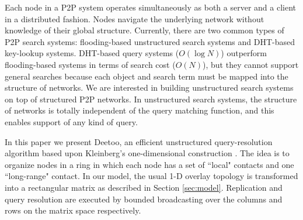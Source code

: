 \documentclass[conference]{IEEEtran}
\begin{document}
Each node in a P2P system operates simultaneously as both a server and a client
in a distributed fashion. Nodes navigate the
underlying network without knowledge of their global structure. 
Currently, there are two common types of P2P search systems: flooding-based
unstructured search systems and DHT-based key-lookup systems. 
DHT-based query systems ($O(\log N)$) outperform flooding-based systems in terms of 
search cost ($O(N)$), but they cannot support general searches because each object
and search term must be mapped into the structure of networks.
We are interested in building unstructured search systems on top of 
structured P2P networks. In unstructured search systems, 
the structure of networks is totally independent of the query matching 
function, and this enables support of any kind of query.  

In this paper we present Deetoo, an efficient unstructured query-resolution 
algorithm based upon Kleinberg's one-dimensional construction
\cite{jk:Algorithmic}. The idea is to organize nodes in a ring in which 
each node has a set of ``local" contacts and one ``long-range" 
contact. 
In our model, the usual 1-D
overlay topology is transformed into a rectangular 
matrix as described in Section \ref{sec:model}.  Replication and 
query resolution are executed by bounded broadcasting over the 
columns and rows on the matrix space respectively.
\end{document}
